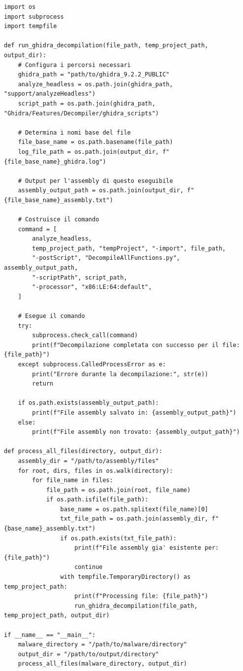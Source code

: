 \begin{lstlisting}[caption={Codice Python per la decompilazione di malware con Ghidra},captionpos=b]
import os
import subprocess
import tempfile

def run_ghidra_decompilation(file_path, temp_project_path, output_dir):
    # Configura i percorsi necessari
    ghidra_path = "path/to/ghidra_9.2.2_PUBLIC"
    analyze_headless = os.path.join(ghidra_path, "support/analyzeHeadless")
    script_path = os.path.join(ghidra_path, "Ghidra/Features/Decompiler/ghidra_scripts")
    
    # Determina i nomi base del file
    file_base_name = os.path.basename(file_path)
    log_file_path = os.path.join(output_dir, f"{file_base_name}_ghidra.log")
    
    # Output per l'assembly di questo eseguibile
    assembly_output_path = os.path.join(output_dir, f"{file_base_name}_assembly.txt")

    # Costruisce il comando
    command = [
        analyze_headless,
        temp_project_path, "tempProject", "-import", file_path,
        "-postScript", "DecompileAllFunctions.py", assembly_output_path,
        "-scriptPath", script_path,
        "-processor", "x86:LE:64:default",
    ]

    # Esegue il comando
    try:
        subprocess.check_call(command)
        print(f"Decompilazione completata con successo per il file: {file_path}")
    except subprocess.CalledProcessError as e:
        print("Errore durante la decompilazione:", str(e))
        return

    if os.path.exists(assembly_output_path):
        print(f"File assembly salvato in: {assembly_output_path}")
    else:
        print(f"File assembly non trovato: {assembly_output_path}")

def process_all_files(directory, output_dir):
    assembly_dir = "/path/to/assembly/files"
    for root, dirs, files in os.walk(directory):
        for file_name in files:
            file_path = os.path.join(root, file_name)
            if os.path.isfile(file_path):
                base_name = os.path.splitext(file_name)[0]
                txt_file_path = os.path.join(assembly_dir, f"{base_name}_assembly.txt")
                if os.path.exists(txt_file_path):
                    print(f"File assembly gia' esistente per: {file_path}")
                    continue
                with tempfile.TemporaryDirectory() as temp_project_path:
                    print(f"Processing file: {file_path}")
                    run_ghidra_decompilation(file_path, temp_project_path, output_dir)

if __name__ == "__main__":
    malware_directory = "/path/to/malware/directory"
    output_dir = "/path/to/output/directory"
    process_all_files(malware_directory, output_dir)
\end{lstlisting}

